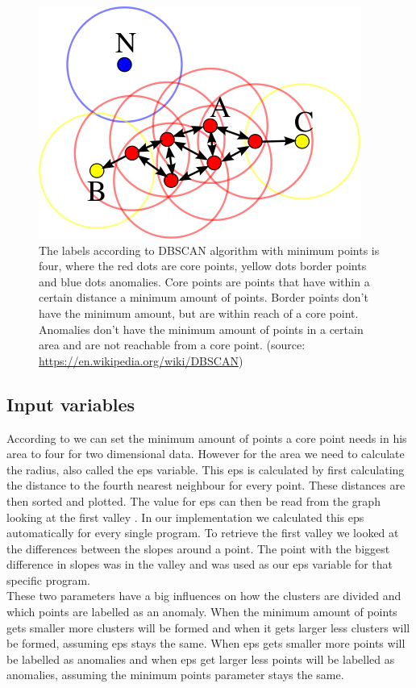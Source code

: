 \begin{figure}[h]
    \centering
    \includegraphics[width=.4\textwidth]{graphs/dbscan.png}
    \caption{The labels according to DBSCAN algorithm with minimum points is four, where the red dots are core points, yellow dots border points and blue dots anomalies. Core points are points that have within a certain distance a minimum amount of points. Border points don't have the minimum amount, but are within reach of a core point. Anomalies don't have the minimum amount of points in a certain area and are not reachable from a core point. (source: \url{https://en.wikipedia.org/wiki/DBSCAN})}
    \label{fig:dbscan}
\end{figure}

\subsection{Input variables}
According to \cite{ester1996density} we can set the minimum amount of points a core point needs in his area to four for two dimensional data. However for the area we need to calculate the radius, also called the eps variable. This eps is calculated by first calculating the distance to the fourth nearest neighbour for every point. These distances are then sorted and plotted. The value for eps can then be read from the graph looking at the first valley \cite{ester1996density}. In our implementation we calculated this eps automatically for every single program. To retrieve the first valley we looked at the differences between the slopes around a point. The point with the biggest difference in slopes was in the valley and was used as our eps variable for that specific program.\\

These two parameters have a big influences on how the clusters are divided and which points are labelled as an anomaly. When the minimum amount of points gets smaller more clusters will be formed and when it gets larger less clusters will be formed, assuming eps stays the same. When eps gets smaller more points will be labelled as anomalies and when eps get larger less points will be labelled as anomalies, assuming the minimum points parameter stays the same.

